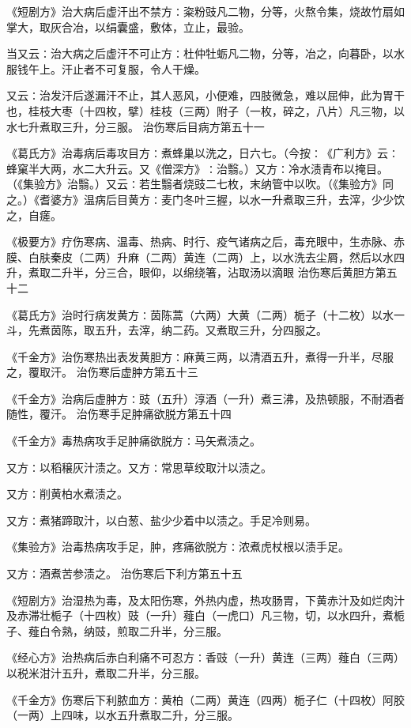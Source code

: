 \documentclass[a4paper,12pt,UTF8,twoside]{ctexbook}
\begin{document}
《短剧方》治大病后虚汗出不禁方∶粢粉豉凡二物，分等，火熬令集，烧故竹扇如掌大，取灰合冶，以绢囊盛，敷体，立止，最验。

当又云∶治大病之后虚汗不可止方∶杜仲牡蛎凡二物，分等，冶之，向暮卧，以水服钱午上。汗止者不可复服，令人干燥。

又云∶治发汗后遂漏汗不止，其人恶风，小便难，四肢微急，难以屈伸，此为胃干也，桂枝大枣（十四枚，擘）桂枝（三两）附子（一枚，碎之，八片）凡三物，以水七升煮取三升，分三服。
治伤寒后目病方第五十一

《葛氏方》治毒病后毒攻目方∶煮蜂巢以洗之，日六七。（今按∶《广利方》云∶蜂窠半大两，水二大升云。又《僧深方》∶治翳。）又方∶冷水渍青布以掩目。（《集验方》治翳。）又云∶若生翳者烧豉二七枚，末纳管中以吹。（《集验方》同之。）《耆婆方》温病后目黄方∶麦门冬叶三握，以水一升煮取三升，去滓，少少饮之，自瘥。

《极要方》疗伤寒病、温毒、热病、时行、疫气诸病之后，毒充眼中，生赤脉、赤膜、白肤秦皮（二两）升麻（二两）黄连（二两）上，以水洗去尘屑，然后以水四升，煮取二升半，分三合，眼仰，以绵绕箸，沾取汤以滴眼
治伤寒后黄胆方第五十二

《葛氏方》治时行病发黄方∶茵陈蒿（六两）大黄（二两）栀子（十二枚）以水一斗，先煮茵陈，取五升，去滓，纳二药。又煮取三升，分四服之。

《千金方》治伤寒热出表发黄胆方∶麻黄三两，以清酒五升，煮得一升半，尽服之，覆取汗。
治伤寒后虚肿方第五十三

《千金方》治病后虚肿方∶豉（五升）淳酒（一升）煮三沸，及热顿服，不耐酒者随性，覆汗。
治伤寒手足肿痛欲脱方第五十四

《千金方》毒热病攻手足肿痛欲脱方∶马矢煮渍之。

又方∶以稻穣灰汁渍之。又方∶常思草绞取汁以渍之。

又方∶削黄柏水煮渍之。

又方∶煮猪蹄取汁，以白葱、盐少少着中以渍之。手足冷则易。

《集验方》治毒热病攻手足，肿，疼痛欲脱方∶浓煮虎杖根以渍手足。

又方∶酒煮苦参渍之。
治伤寒后下利方第五十五

《短剧方》治湿热为毒，及太阳伤寒，外热内虚，热攻肠胃，下黄赤汁及如烂肉汁及赤滞壮栀子（十四枚）豉（一升）薤白（一虎口）凡三物，切，以水四升，煮栀子、薤白令熟，纳豉，煎取二升半，分三服。

《经心方》治热病后赤白利痛不可忍方∶香豉（一升）黄连（三两）薤白（三两）以税米泔汁五升，煮取二升半，分三服。

《千金方》伤寒后下利脓血方∶黄柏（二两）黄连（四两）栀子仁（十四枚）阿胶（一两）上四味，以水五升煮取二升，分三服。
\end{document}
